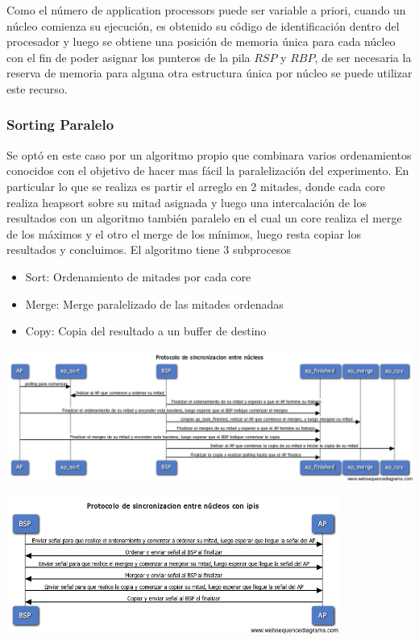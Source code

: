 \documentclass{beamer}
\begin{document}
\begin{frame}
	    Como el número de application processors puede ser variable a priori, cuando un núcleo comienza su ejecución, es obtenido su código de identificación dentro del procesador y luego se obtiene una posición de memoria única para cada núcleo con el fin de poder asignar los punteros de la pila $RSP$ y $RBP$, de ser necesaria la reserva de memoria para alguna otra estructura única por núcleo se puede utilizar este recurso.
	\end{frame}

	\begin{frame}
		\frametitle{Sorting Paralelo}
		Se optó en este caso por un algoritmo propio que combinara varios ordenamientos conocidos con el objetivo de hacer mas fácil la paralelización del experimento. En particular lo que se realiza es partir el arreglo en 2 mitades, donde cada core realiza heapsort sobre su mitad asignada y luego una intercalación de los resultados con un algoritmo también paralelo en el cual un core realiza el merge de los máximos y el otro el merge de los mínimos, luego resta copiar los resultados y concluimos.
		El algoritmo tiene 3 subprocesos
		\begin{itemize}
			\item Sort: Ordenamiento de mitades por cada core
			\item Merge: Merge paralelizado de las mitades ordenadas
			\item Copy: Copia del resultado a un buffer de destino
		\end{itemize}
	\end{frame}

	\begin{frame}
		\begin{center}
	        \includegraphics[scale=0.28]{images/sync-sorting-seq.png}
	    \end{center}
	\end{frame}

	\begin{frame}
	    \begin{center}
	        \includegraphics[height=4.5cm]{images/ipis-sorting-seq.png}
	    \end{center}
	\end{frame}
\end{document}
